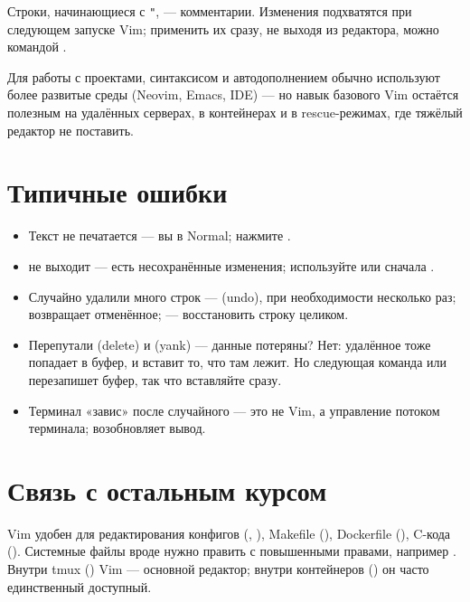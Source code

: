 Строки, начинающиеся с \verb|"|, --- комментарии. Изменения подхватятся
при следующем запуске Vim; применить их сразу, не выходя из редактора,
можно командой .

Для работы с проектами, синтаксисом и автодополнением обычно
используют более развитые среды (Neovim, Emacs, IDE) --- но
навык базового Vim остаётся полезным на удалённых серверах,
в контейнерах и в rescue-режимах, где тяжёлый редактор
не поставить.

\section{Типичные ошибки}
\begin{itemize}
  \item Текст не печатается --- вы в Normal; нажмите .
  \item {} не выходит --- есть несохранённые изменения;
    используйте  или сначала .
  \item Случайно удалили много строк ---  (undo), при
    необходимости несколько раз;  возвращает отменённое;
     --- восстановить строку целиком.
  \item Перепутали  (delete) и  (yank) --- данные
    потеряны? Нет: удалённое тоже попадает в буфер, и  вставит
    то, что там лежит. Но следующая команда  или 
    перезапишет буфер, так что вставляйте сразу.
  \item Терминал «завис» после случайного  --- это не Vim,
    а управление потоком терминала;  возобновляет вывод.
\end{itemize}

\section{Связь с остальным курсом}

Vim удобен для редактирования конфигов
(, ), Makefile
(), Dockerfile
(), C-кода
(). Системные файлы вроде
 нужно править с повышенными правами, например
. Внутри tmux
() Vim --- основной редактор;
внутри контейнеров () он часто
единственный доступный.

